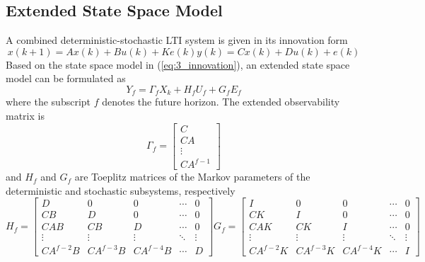 \subsection{Extended State Space Model}
A combined deterministic-stochastic LTI system is given in its innovation form
\begin{subequations}\label{eq:3_innovation}
\begin{equation}x(k+1) = Ax(k) + Bu(k) + Ke(k)\end{equation}
\begin{equation}y(k) = Cx(k) + Du(k) + e(k)\end{equation}
\end{subequations}
Based on the state space model in (\ref{eq:3_innovation}), an extended state space model can be formulated as
\begin{equation}\label{eq:3_extended_state_space}
Y_f = \Gamma_f X_k + H_f U_f + G_f E_f
\end{equation}
where the subscript $f$ denotes the future horizon. The extended observability matrix is
\begin{equation}\label{eq:3_extended_observability}
\Gamma_f = \begin{bmatrix}C\\ CA\\ \vdots\\ CA^{f-1}\end{bmatrix}
\end{equation}
and $H_f$ and $G_f$ are Toeplitz matrices of the Markov parameters of the deterministic and stochastic subsystems, respectively
\begin{subequations}\label{eq:3_toeplitz}
\begin{equation}
H_f = \begin{bmatrix}
D & 0 & 0 & \cdots & 0\\
CB & D & 0 & \cdots & 0\\
CAB & CB & D & \cdots & 0\\
\vdots & \vdots  & \vdots & \ddots & \vdots\\
CA^{f-2}B & CA^{f-3}B & CA^{f-4}B & \cdots & D
\end{bmatrix}
\end{equation}
\begin{equation}
G_f = \begin{bmatrix}
I & 0 & 0 & \cdots & 0\\
CK & I & 0 & \cdots & 0\\
CAK & CK & I & \cdots & 0\\
\vdots & \vdots  & \vdots & \ddots & \vdots\\
CA^{f-2}K & CA^{f-3}K & CA^{f-4}K & \cdots & I
\end{bmatrix}
\end{equation}
\end{subequations}

